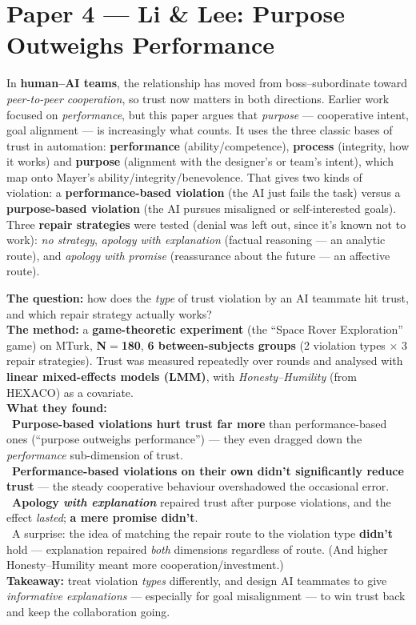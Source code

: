 \documentclass[11pt, oneside]{book}
\begin{document}
\section{Paper 4 — Li \& Lee: Purpose Outweighs Performance}

In \textbf{human–AI teams}, the relationship has moved from boss–subordinate
toward \emph{peer-to-peer cooperation}, so trust now matters in both
directions. Earlier work focused on \emph{performance}, but this paper argues
that \emph{purpose} — cooperative intent, goal alignment — is increasingly what
counts. It uses the three classic bases of trust in automation:
\textbf{performance} (ability/competence), \textbf{process} (integrity, how it
works) and \textbf{purpose} (alignment with the designer's or team's intent),
which map onto Mayer's ability/integrity/benevolence. That gives two kinds of
violation: a \textbf{performance-based violation} (the AI just fails the task)
versus a \textbf{purpose-based violation} (the AI pursues misaligned or
self-interested goals). Three \textbf{repair strategies} were tested (denial
was left out, since it's known not to work): \emph{no strategy}, \emph{apology
with explanation} (factual reasoning — an analytic route), and \emph{apology
with promise} (reassurance about the future — an affective route).

\begin{thmbox}[title={Paper 4 — what you need to remember}]
\textbf{The question:} how does the \emph{type} of trust violation by an AI
teammate hit trust, and which repair strategy actually works?\\
\textbf{The method:} a \textbf{game-theoretic experiment} (the ``Space Rover
Exploration'' game) on MTurk, \textbf{N$=$180}, \textbf{6 between-subjects
groups} (2 violation types $\times$ 3 repair strategies). Trust was measured
repeatedly over rounds and analysed with \textbf{linear mixed-effects models
(LMM)}, with \emph{Honesty–Humility} (from HEXACO) as a covariate.\\
\textbf{What they found:}\\
\textbullet\ \textbf{Purpose-based violations hurt trust far more} than
performance-based ones (``purpose outweighs performance'') — they even dragged
down the \emph{performance} sub-dimension of trust.\\
\textbullet\ \textbf{Performance-based violations on their own didn't
significantly reduce trust} — the steady cooperative behaviour overshadowed
the occasional error.\\
\textbullet\ \textbf{Apology \emph{with explanation}} repaired trust after
purpose violations, and the effect \emph{lasted}; \textbf{a mere promise
didn't}.\\
\textbullet\ A surprise: the idea of matching the repair route to the violation
type \textbf{didn't} hold — explanation repaired \emph{both} dimensions
regardless of route. (And higher Honesty–Humility meant more
cooperation/investment.)\\
\textbf{Takeaway:} treat violation \emph{types} differently, and design AI
teammates to give \emph{informative explanations} — especially for goal
misalignment — to win trust back and keep the collaboration going.
\end{thmbox}
\end{document}
